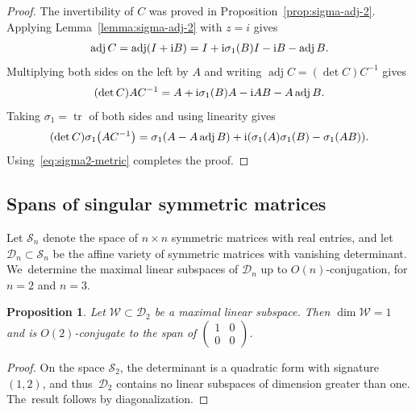 \documentclass[pdftex]{sigma}
\def\adj{\operatorname{adj}}
\def\calS{\mathcal{S}}
\def\W{\mathscr{W}}
\def\D{\mathcal{D}}
\def\tr{\operatorname{tr}}
\newtheorem{Proposition}[Theorem]{Proposition}
\numberwithin{equation}{section}
\begin{document}
\begin{proof}
The invertibility of $C$ was proved in Proposition~\ref{prop:sigma-adj-2}. Applying Lemma~\ref{lemma:sigma-adj-2} with $z=i$ gives
\begin{gather*}
 \adj C = \adj(I + {\rm i} B) = I + {\rm i} \sigma_1 (B) I - {\rm i}B - \adj B.
 \end{gather*}
Multiplying both sides on the left by $A$ and writing $\adj C = (\det C) C^{-1}$ gives
\begin{gather*}
 (\det C) A C^{-1} = A + {\rm i} \sigma_1 (B) A - {\rm i} AB - A \adj B.
 \end{gather*}
Taking $\sigma_1 = \tr$ of both sides and using linearity gives
\begin{gather*}
(\det C) \sigma_1 \big(A C^{-1}\big) = \sigma_1 (A - A \adj B) + {\rm i} ( \sigma_1 (A) \sigma_1 (B) - \sigma_1 (AB) ).
\end{gather*}
Using~\eqref{eq:sigma2-metric} completes the proof.
\end{proof}

\subsection{Spans of singular symmetric matrices} \label{sec:app-singular}

Let $\calS_n$ denote the space of $n\times n$ symmetric matrices with real entries, and let $\D_n \subset \calS_n$ be the affine variety of symmetric matrices with vanishing determinant. We~determine the maximal linear subspaces of $\D_n$ up to $O(n)$-conjugation, for $n=2$ and $n=3$.

\begin{Proposition} \label{sing2max}
Let $\W \subset \D_2$ be a maximal linear subspace. Then $\dim \W =1$ and is $O(2)$-con\-jugate to the span of $\left(\begin{smallmatrix} 1 &0 \\ 0 & 0 \end{smallmatrix}\right)$.
\end{Proposition}
\begin{proof} On the space $\calS_2$, the determinant is a quadratic form with signature $(1,2)$, and thus~$\D_2$ contains no linear subspaces of dimension greater than one. The~result follows by diagona\-lization.
\end{proof}
\end{document}
